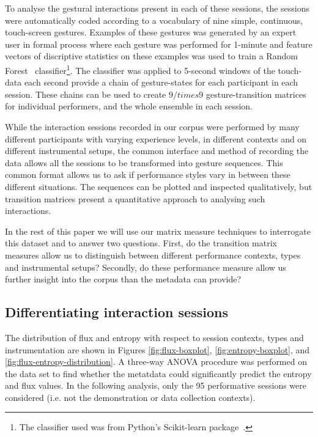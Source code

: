 \documentclass{sigchi}
\begin{document}
To analyse the gestural interactions present in each of these
sessions, the sessions were automatically coded according to a
vocabulary of nine simple, continuous, touch-screen gestures. Examples
of these gestures was generated by an expert user in formal process
where each gesture was performed for 1-minute and feature vectors of
discriptive statistics on these examples was used to train a Random
Forest~\cite{Breiman:2001kx} classifier\footnote{The classifier used
  was from Python's Scikit-learn package~\cite{scikit-learn}.}. The
classifier was applied to 5-second windows of the touch-data each
second provide a chain of gesture-states for each participant in each
session. These chains can be used to create $9 /times 9$
gesture-transition matrices for individual performers, and the whole
ensemble in each session.




While the interaction sessions recorded in our corpus were performed
by many different participants with varying experience levels, in
different contexts and on different instrumental setups, the common
interface and method of recording the data allows all the sessions to
be transformed into gesture sequences. This common format allows us to
ask if performance styles vary in between these different situations.
The sequences can be plotted and inspected qualitatively, but
transition matrices present a quantitative approach to analysing such
interactions.

In the rest of this paper we will use our matrix measure techniques to
interrogate this dataset and to answer two questions. First, do the
transition matrix measures allow us to distinguish between different
performance contexts, types and instrumental setups? Secondly, do
these performance measure allow us further insight into the corpus
than the metadata can provide?

\subsection{Differentiating interaction sessions}
\label{differentiating-interaction-sessions}

The distribution of flux and entropy with respect to session contexts,
types and instrumentation are shown in Figures \ref{fig:flux-boxplot},
\ref{fig:entropy-boxplot}, and \ref{fig:flux-entropy-distribution}. A
three-way ANOVA procedure was performed on the data set to find
whether the metatdata could significantly predict the entropy and flux
values. In the following analysis, only the 95 performative sessions
were considered (i.e. not the demonstration or data collection
contexts).
\end{document}
